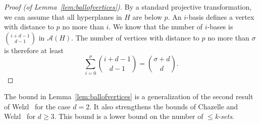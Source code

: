 \documentclass [letterpaper] {article}
\begin{document}
\begin{proof}[Proof (of Lemma~\ref{lem:ballofvertices})]
By a standard projective transformation, we can assume that all hyperplanes in $H$ are below $p$. An $i$-basis defines a vertex with distance to $p$ no more than $i$. We know that the number of $i$-bases is $\binom{i+d-1}{d-1}$ in $\mathcal{A}(H)$. The number of vertices with distance to $p$ no more than $\sigma$ is therefore at least
\[ \sum_{i=0}^{\sigma}\binom{i+d-1}{d-1} = \binom{\sigma+d}{d} .\]
\end{proof}

The bound in Lemma~\ref{lem:ballofvertices} is a generalization of the second result of Welzl~\cite{welzl92} for the case $d = 2$. It also strengthens the bounds of Chazelle and Welzl~\cite{Chazelle89} for $d\ge 3$. This bound is a lower bound on the number of \emph{$\leq$k-sets}.

\end{document}
